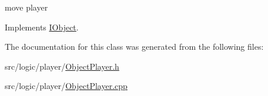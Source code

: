 move player 



Implements \hyperlink{class_i_object_a1bbc27b2cecbda3cf57fd6ed0099d98a}{I\+Object}.



The documentation for this class was generated from the following files\+:\begin{DoxyCompactItemize}
\item 
src/logic/player/\hyperlink{_object_player_8h}{Object\+Player.\+h}\item 
src/logic/player/\hyperlink{_object_player_8cpp}{Object\+Player.\+cpp}\end{DoxyCompactItemize}

